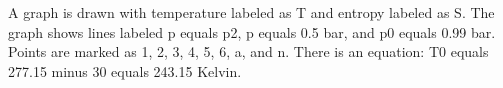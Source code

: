 A graph is drawn with temperature labeled as T and entropy labeled as S. The graph shows lines labeled p equals p2, p equals 0.5 bar, and p0 equals 0.99 bar. Points are marked as 1, 2, 3, 4, 5, 6, a, and n. There is an equation: T0 equals 277.15 minus 30 equals 243.15 Kelvin.